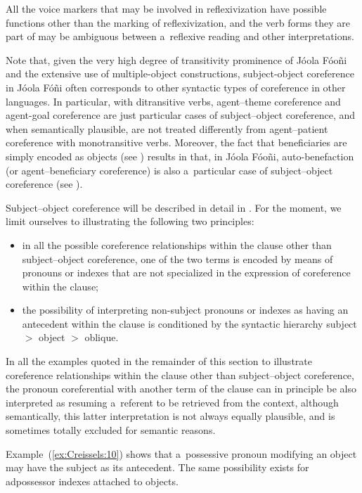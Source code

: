 \documentclass[output=paper]{langscibook}
\begin{document}
All the voice markers that may be involved in reflexivization have possible
functions other than the marking of reflexivization, and the verb forms they
are part of may be ambiguous between a~reflexive reading and other
interpretations.

Note that, given the very high degree of transitivity prominence of Jóola Fóoñi
and the extensive use of multiple-object constructions, subject-object
coreference in Jóola Fóñi often corresponds to other syntactic types of
coreference in other languages.  In particular, with ditransitive verbs,
agent--theme coreference and agent-goal coreference are just particular cases
of subject--object coreference, and when semantically plausible, are not
treated differently from agent--patient coreference with monotransitive verbs.
Moreover, the fact that beneficiaries are simply encoded as objects (see
) results in that, in Jóola Fóoñi,
auto-benefaction (or agent--beneficiary coreference) is also a~particular case
of subject--object coreference (see ).

Subject--object coreference will be described in detail in
.  For the moment, we limit ourselves to
illustrating the following two principles:

\begin{itemize}
\item in all the possible coreference relationships within the clause other
  than subject--object coreference, one of the two terms is encoded by means of
  pronouns or indexes that are not specialized in the expression of coreference
  within the clause;
\item the possibility of interpreting non-subject pronouns or indexes as having
  an antecedent within the clause is conditioned by the syntactic hierarchy
  subject $>$ object $>$ oblique.
\end{itemize}

In all the examples quoted in the remainder of this section to illustrate
coreference relationships within the clause other than subject--object
coreference, the pronoun coreferential with another term of the clause can in
principle be also interpreted as resuming a~referent to be retrieved from the
context, although semantically, this latter interpretation is not always
equally plausible, and is sometimes totally excluded for semantic reasons.

Example~(\ref{ex:Creissels:10}) shows that a~possessive pronoun modifying an object
may have the subject as its antecedent.  The same possibility exists for
adpossessor indexes attached to objects.
\end{document}
